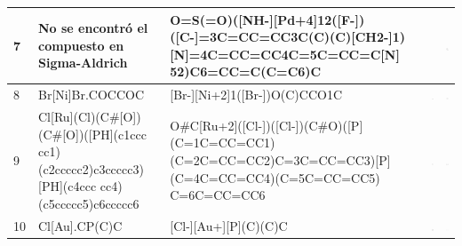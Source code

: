 \begin{landscape}
\begin{longtable}{m{0.3cm}m{6.7cm}m{7.7cm}m{2.3cm}m{2.3cm}}
 7 &
 No se encontró el compuesto en Sigma-Aldrich & 
 O=S(=O)([NH-][Pd+4]12([F-])([C-]=3C=CC=CC3C(C)(C)[CH2-]1) [N]=4C=CC=CC4C=5C=CC=C[N] 52)C6=CC=C(C=C6)C & 
 & 
 \includegraphics[width=2.2cm]{imagenes/sciFinder/pdf/Palladium, (2,2-bipyridine-ÎºN1,ÎºN1)[(2,2-dimethyl-1,2-ethanediyl)-1,2-phenylene]fluoro(4-methylbenzenesulfonamidato-ÎºN)-, (OC-6-35).pdf} \\
\hline


 8 &
 Br[Ni]Br.COCCOC & 
 [Br-][Ni+2]1([Br-])O(C)CCO1C & 
 \includegraphics[width=2.2cm]{imagenes/sigmaAldrich/Nickel(II) bromide ethylene glycol dimethyl ether complex.png} & 
 \includegraphics[width=2.2cm]{imagenes/sciFinder/pdf/Dibromo(1,2-dimethoxyethane)nickel(II).pdf} \\
\hline


 9 &
 Cl[Ru](Cl)(C\#[O])(C\#[O])([PH](c1ccc cc1)(c2ccccc2)c3ccccc3)[PH](c4ccc cc4)(c5ccccc5)c6ccccc6 & 
 O\#C[Ru+2]([Cl-])([Cl-])(C\#O)([P](C=1C=CC=CC1) (C=2C=CC=CC2)C=3C=CC=CC3)[P] (C=4C=CC=CC4)(C=5C=CC=CC5) C=6C=CC=CC6 & 
 \includegraphics[width=2.2cm]{imagenes/sigmaAldrich/Bis(triphenylphosphine)ruthenium(II) dicarbonyl chloride.jpeg} & 
 \includegraphics[width=2.2cm]{imagenes/sciFinder/pdf/Bis(triphenylphosphine)ruthenium(II) dicarbonyl chloride.pdf} \\
\hline

 10 &
 Cl[Au].CP(C)C & 
 [Cl-][Au+][P](C)(C)C & 
 \includegraphics[width=2.2cm]{imagenes/sigmaAldrich/Chloro(trimethylphosphine)gold(I).png} & 
 \includegraphics[width=2.2cm]{imagenes/sciFinder/pdf/Chloro(trimethylphosphine)gold(I).pdf} \\
\hline



\end{longtable}
\end{landscape}
